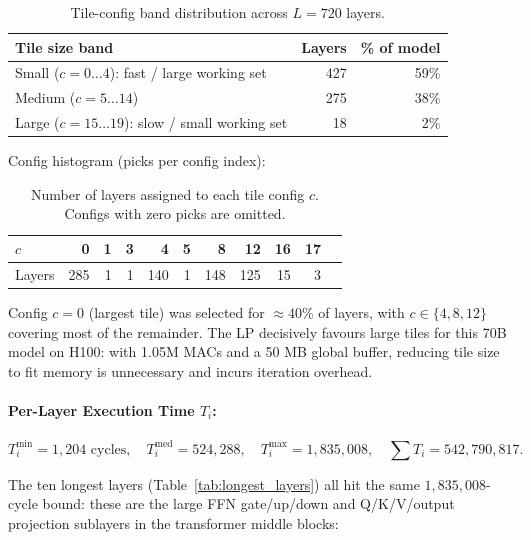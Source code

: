 \begin{table}[h]
\centering
\caption{Tile-config band distribution across $L=720$ layers.}
\label{tab:tile_band}
\begin{tabular}{lrr}
\toprule
\textbf{Tile size band} & \textbf{Layers} & \textbf{\% of model} \\
\midrule
Small ($c = 0\ldots4$): fast / large working set  & 427 & 59\% \\
Medium ($c = 5\ldots14$)                            & 275 & 38\% \\
Large ($c = 15\ldots19$): slow / small working set &  18 &  2\% \\
\bottomrule
\end{tabular}
\end{table}

\noindent Config histogram (picks per config index):

\begin{table}[h]
\centering
\caption{Number of layers assigned to each tile config $c$.
Configs with zero picks are omitted.}
\label{tab:config_histogram}
\begin{tabular}{lrrrrrrrrrr}
\toprule
$c$ & 0 & 1 & 3 & 4 & 5 & 8 & 12 & 16 & 17 \\
\midrule
Layers & 285 & 1 & 1 & 140 & 1 & 148 & 125 & 15 & 3 \\
\bottomrule
\end{tabular}
\end{table}

\noindent Config $c=0$ (largest tile) was selected for ${\approx}40\%$
of layers, with $c \in \{4, 8, 12\}$ covering most of the remainder.
The LP decisively favours large tiles for this 70B model on H100:
with 1.05M MACs and a 50 MB global buffer, reducing tile size to fit
memory is unnecessary and incurs iteration overhead.

\paragraph{Per-Layer Execution Time $T_i$:}

\[
    T_i^{\min} = 1{,}204 \text{ cycles}, \quad
    T_i^{\mathrm{med}} = 524{,}288, \quad
    T_i^{\max} = 1{,}835{,}008, \quad
    \textstyle\sum T_i = 542{,}790{,}817.
\]

\noindent The ten longest layers (Table~\ref{tab:longest_layers}) all hit the same $1{,}835{,}008$-cycle bound: these are the large FFN gate/up/down and Q/K/V/output projection sublayers in the transformer middle blocks:

